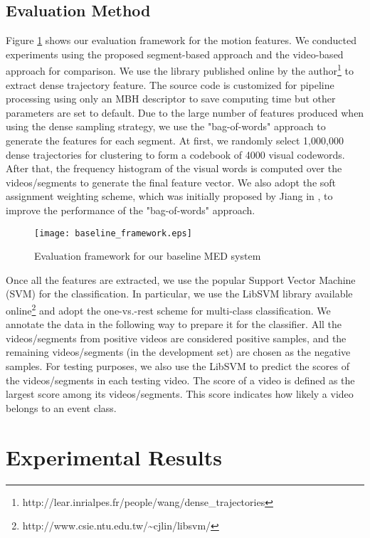 \subsection{Evaluation Method}
\label{experimentalsetup:2}
%
Figure \ref{framework} shows our evaluation framework for the motion features. We conducted experiments using the proposed segment-based approach and the video-based approach for comparison. We use the library published online by the author\footnote{http://lear.inrialpes.fr/people/wang/dense\_trajectories} to extract dense trajectory feature. The source code is customized for pipeline processing using only an MBH descriptor to save computing time but other parameters are set to default. Due to the large number of features produced when using the dense sampling strategy, we use the "bag-of-words" approach to generate the features for each segment. At first, we randomly select 1,000,000 dense trajectories for clustering to form a codebook of 4000 visual codewords. After that, the frequency histogram of the visual words is computed over the videos/segments to generate the final feature vector. We also adopt the soft assignment weighting scheme, which was initially proposed by Jiang in \cite{Jiang:2007:TOB}, to improve the performance of the "bag-of-words" approach.
\begin{figure}
	\centering
	\texttt{[image: baseline\_framework.eps]}
	\caption{Evaluation framework for our baseline MED system}
	\label{framework}
\end{figure}

Once all the features are extracted, we use the popular Support Vector Machine (SVM) for the classification. In particular, we use the LibSVM library available online\footnote{http://www.csie.ntu.edu.tw/{\textasciitilde}cjlin/libsvm/} and adopt the one-vs.-rest scheme for multi-class classification. We annotate the data in the following way to prepare it for the classifier. All the videos/segments from positive videos are considered positive samples, and the remaining videos/segments (in the development set) are chosen as the negative samples. For testing purposes, we also use the LibSVM to predict the scores of the videos/segments in each testing video. The score of a video is defined as the largest score among its videos/segments. This score indicates how likely a video belongs to an event class.

\section{Experimental Results}
\label{experimentalresult}

